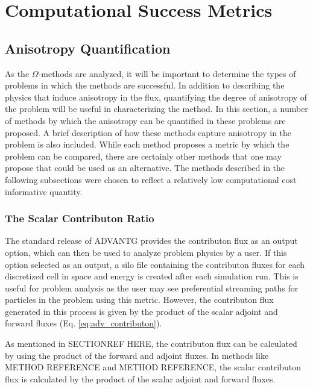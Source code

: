 \newcommand{\anglevars}{x,y,z,E_g,\theta,\varphi}
\newcommand{\scalarvars}{x,y,z,E_g}


\section{Computational Success Metrics}
\label{sec:successmetrics}
\subsection{Anisotropy Quantification}
\label{sec:anisotropy_quant}

As the $\Omega$-methods are analyzed, it will be important to determine the
types of problems in which the methods are successful. In addition to describing
the physics that induce anisotropy in the flux, quantifying the degree of
anisotropy of the problem will be useful in characterizing the method. In this
section, a number
of methods by which the anisotropy can be quantified in these problems are
proposed. A brief description of how these methods capture anisotropy in the
problem is also included. While each method proposes a metric by which the
problem can be compared, there are certainly other methods that one may propose
that could be used as an alternative. The methods described in the following
subsections were chosen to reflect a relatively low computational cost
informative quantity.

\subsubsection{The Scalar Contributon Ratio}

The standard release of ADVANTG provides the contributon flux as an output
option, which can then be used to analyze problem physics by a user.
If this option selected as an output, a silo file containing
the contributon fluxes for each discretized cell in space and energy  is
created after
each simulation run. This is useful for problem analysis as the user may see
preferential streaming paths for particles in the problem using this metric.
However, the contributon flux generated in this process is given by the product
of the scalar adjoint and forward fluxes (Eq. \eqref{eq:adv_contributon}).

As mentioned in SECTIONREF HERE, the contributon flux can be calculated by using
the product of the forward and adjoint fluxes. In methods like METHOD REFERENCE
and METHOD REFERENCE, the scalar contributon flux is calculated by the product
of the scalar adjoint and forward fluxes.

